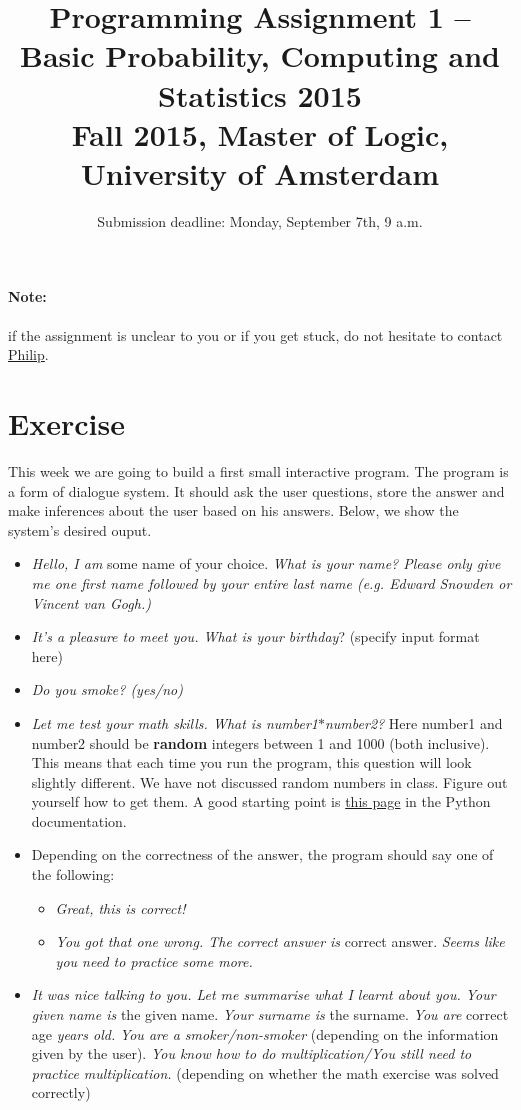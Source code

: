 \documentclass[11pt, leqno, a4paper]{article}
\title{Programming Assignment 1 -- Basic Probability, Computing and Statistics 2015 \\[2mm]
\large{Fall 2015, Master of Logic, University of Amsterdam}}
\author{}
\date{Submission deadline: Monday, September 7th, 9 a.m.}
\begin{document}
\maketitle

\paragraph{Note:} if the assignment is unclear to you or if you get stuck, do not hesitate to contact \href{mailto:P.Schulz@uva.nl}{Philip}.

\section{Exercise}
This week we are going to build a first small interactive program. The program is a form of dialogue system. It should ask the user questions,
store the answer and make inferences about the user based on his answers. Below, we show the system's desired ouput. 
\begin{itemize}
\item \textit{Hello, I am} some name of your choice. \textit{What is
    your name? Please only give me one first name followed by your
    entire last name (e.g. \emph{Edward Snowden} or \emph{Vincent van Gogh}.)}
\item \textit{It's a pleasure to meet you. What is your birthday}? (specify input format here)
\item \textit{Do you smoke? (yes/no)}
\item \textit{Let me test your math skills. What is number1$ *
    $number2?} Here number1 and number2 should be \textbf{random} integers between 1 and 1000
(both inclusive). This means that each time you run the program, this question will look slightly different. We have not discussed random
numbers in class. Figure out yourself how to get them. A good starting point is 
\href{https://docs.python.org/2/library/random.html}{this page} in the Python documentation.
\item Depending on the correctness of the answer, the program should say one of the following:
\begin{itemize}
\item \textit{Great, this is correct!}
\item \textit{You got that one wrong. The correct answer is} correct answer. \textit{Seems like you need to practice some more.}
\end{itemize}
\item \textit{It was nice talking to you. Let me summarise what I learnt about you. Your given name is} the given name. \textit{Your surname is}
the surname. \textit{You are} correct age \textit{years old.} 
\textit{You are a smoker/non-smoker} (depending on the information given by the user). \textit{You know how to do multiplication/You still
need to practice multiplication.} (depending on whether the math exercise was solved correctly)
\end{itemize}
\end{document}
